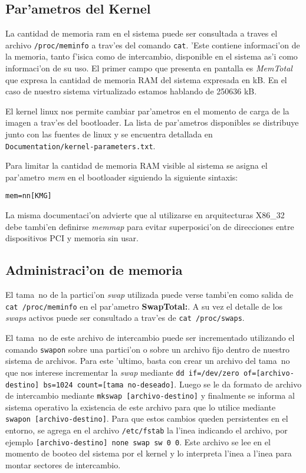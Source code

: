 \subsection{Par'ametros del Kernel}
La cantidad de memoria ram en el sistema puede ser consultada a traves el archivo \texttt{/proc/meminfo} a trav'es del comando \texttt{cat}. 'Este contiene informaci'on de la memoria, tanto f'isica como de intercambio, disponible en el sistema as'i como informaci'on de su uso. El primer campo que presenta en pantalla es \emph{MemTotal} que expresa la cantidad de memoria RAM del sistema expresada en kB. En el caso de nuestro sistema virtualizado estamos hablando de 250636 kB.

El kernel linux nos permite cambiar par'ametros en el momento de carga de la imagen a trav'es del bootloader. La lista de par'ametros disponibles se distribuye junto con las fuentes de linux y se encuentra detallada en \texttt{Documentation/kernel-parameters.txt}.

Para limitar la cantidad de memoria RAM visible al sistema se asigna el par'ametro \emph{mem} en el bootloader siguiendo la siguiente sintaxis:

\texttt{mem=nn[KMG]}

La misma documentaci'on advierte que al utilizarse en arquitecturas X86\_32 debe tambi'en definirse \emph{memmap} para evitar superposici'on de direcciones entre dispositivos PCI y memoria sin usar.

\subsection{Administraci'on de memoria}
El tama~no de la partici'on \emph{swap} utilizada puede verse tambi'en como salida de \texttt{cat /proc/meminfo} en el par'ametro \textbf{SwapTotal:}. A su vez el detalle de los \emph{swaps} activos puede ser consultado a trav'es de \texttt{cat /proc/swaps}.

El tama~no de este archivo de intercambio puede ser incrementado utilizando el comando \texttt{swapon} sobre una partici'on o sobre un archivo fijo dentro de nuestro sistema de archivos. Para este 'ultimo, basta con crear un archivo del tama~no que nos interese incrementar la \emph{swap} mediante \texttt{dd if=/dev/zero of=[archivo-destino] bs=1024 count=[tama~no-deseado]}. Luego se le da formato de archivo de intercambio mediante \texttt{mkswap [archivo-destino]} y finalmente se informa al sistema operativo la existencia de este archivo para que lo utilice mediante \texttt{swapon [archivo-destino]}. Para que estos cambios queden persistentes en el entorno, se agrega en el archivo \texttt{/etc/fstab} la l'inea indicando el archivo, por ejemplo \texttt{[archivo-destino] none swap sw 0 0}. Este archivo se lee en el momento de booteo del sistema por el kernel y lo interpreta l'inea a l'inea para montar sectores de intercambio.
